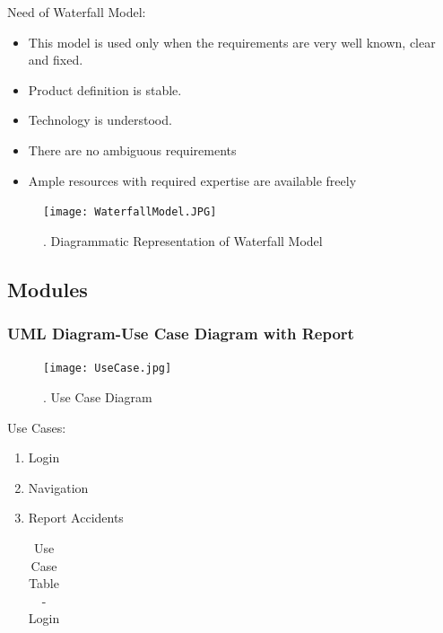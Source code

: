 \documentclass{article}
\begin{document}
\begin{flushleft}
            Need of Waterfall Model:
            \begin{itemize}
                \item This model is used only when the requirements are very well known, clear and fixed.
                \item Product definition is stable.
                \item Technology is understood.
                \item There are no ambiguous requirements
                \item Ample resources with required expertise are available freely
                
            \end{itemize}
            \begin{figure}[!ht]
              
              \texttt{[image: WaterfallModel.JPG]}
              \renewcommand{\thefigure}{ \thesubsection.\arabic{figure}}
              \caption{ .  Diagrammatic Representation of Waterfall Model}
            \end{figure}
            
            \newpage
        \subsection{Modules}
            \subsubsection{UML Diagram-Use Case Diagram with Report}
            \begin{figure}[!ht]
              
              \texttt{[image: UseCase.jpg]}
              \renewcommand{\thefigure}{ \thesubsection.\arabic{figure}}
              \caption{ .  Use Case Diagram}
            \end{figure}
            \newpage
            Use Cases:
            \begin{enumerate}
                \item Login
                \item Navigation
                \item Report Accidents
                
                \begin{center}
           \begin{table}[!ht]
           \renewcommand\thetable{4.2.1}
               \centering
               \caption{Use Case Table - Login}
               \label{""""}
              \begin{tabular}{ | m{7em} | m{7cm} | }
           

\end{tabular}
\end{table}
\end{center}
\end{enumerate}
\end{flushleft}
\end{document}
